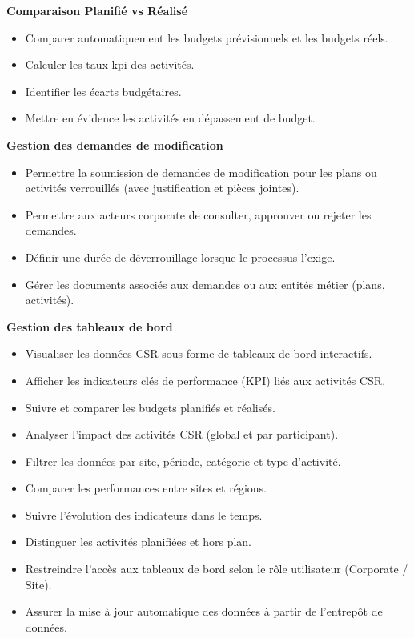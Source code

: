 \textbf{Comparaison Planifié vs Réalisé}

\begin{itemize}[label=\textbullet, itemsep=0.15ex, parsep=0pt, topsep=0pt, partopsep=0pt]
  \item Comparer automatiquement les budgets prévisionnels et les budgets réels.
  \item Calculer les taux kpi des activités.
  \item Identifier les écarts budgétaires.
  \item Mettre en évidence les activités en dépassement de budget.
\end{itemize}

\textbf{Gestion des demandes de modification}

\begin{itemize}[label=\textbullet, itemsep=0.15ex, parsep=0pt, topsep=0pt, partopsep=0pt]
  \item Permettre la soumission de demandes de modification pour les plans ou activités verrouillés (avec justification et pièces jointes).
  \item Permettre aux acteurs corporate de consulter, approuver ou rejeter les demandes.
  \item Définir une durée de déverrouillage lorsque le processus l’exige.
  \item Gérer les documents associés aux demandes ou aux entités métier (plans, activités).
\end{itemize}

\textbf{Gestion des tableaux de bord}

\begin{itemize}[label=\textbullet, itemsep=0.15ex, parsep=0pt, topsep=0pt, partopsep=0pt]
  \item Visualiser les données CSR sous forme de tableaux de bord interactifs.
  \item Afficher les indicateurs clés de performance (KPI) liés aux activités CSR.
  \item Suivre et comparer les budgets planifiés et réalisés.
  \item Analyser l’impact des activités CSR (global et par participant).
  \item Filtrer les données par site, période, catégorie et type d’activité.
  \item Comparer les performances entre sites et régions.
  \item Suivre l’évolution des indicateurs dans le temps.
  \item Distinguer les activités planifiées et hors plan.
  \item Restreindre l’accès aux tableaux de bord selon le rôle utilisateur (Corporate / Site).
  \item Assurer la mise à jour automatique des données à partir de l’entrepôt de données.
\end{itemize}

